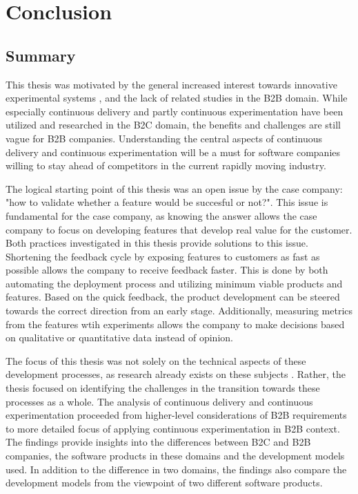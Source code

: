 \documentclass[english]{tktltiki2}
\theoremstyle{definition}
\theoremstyle{remark}
\begin{document}
\section{Conclusion}

\subsection{Summary}
This thesis was motivated by the general increased interest towards innovative experimental systems \cite{olsson2012climbing}, and the lack of related studies in the B2B domain. While especially continuous delivery and partly continuous experimentation have been utilized and researched in the B2C domain, the benefits and challenges are still vague for B2B companies. Understanding the central aspects of continuous delivery and continuous experimentation will be a must for software companies willing to stay ahead of competitors in the current rapidly moving industry.

The logical starting point of this thesis was an open issue by the case company: "how to validate whether a feature would be succesful or not?". This issue is fundamental for the case company, as knowing the answer allows the case company to focus on developing features that develop real value for the customer. Both practices investigated in this thesis provide solutions to this issue. Shortening the feedback cycle by exposing features to customers as fast as possible allows the company to receive feedback faster. This is done by both automating the deployment process and utilizing minimum viable products and features. Based on the quick feedback, the product development can be steered towards the correct direction from an early stage. Additionally, measuring metrics from the features wtih experiments allows the company to make decisions based on qualitative or quantitative data instead of opinion.
%

The focus of this thesis was not solely on the technical aspects of these development processes, as research already exists on these subjects \cite{kohavi2007practical, eklund2012architecture, cdbook}. Rather, the thesis focused on identifying the challenges in the transition towards these processes as a whole. The analysis of continuous delivery and continuous experimentation proceeded from higher-level considerations of B2B requirements to more detailed focus of applying continuous experimentation in B2B context. The findings provide insights into the differences between B2C and B2B companies, the software products in these domains and the development models used. In addition to the difference in two domains, the findings also compare the development models from the viewpoint of two different software products.
\end{document}
